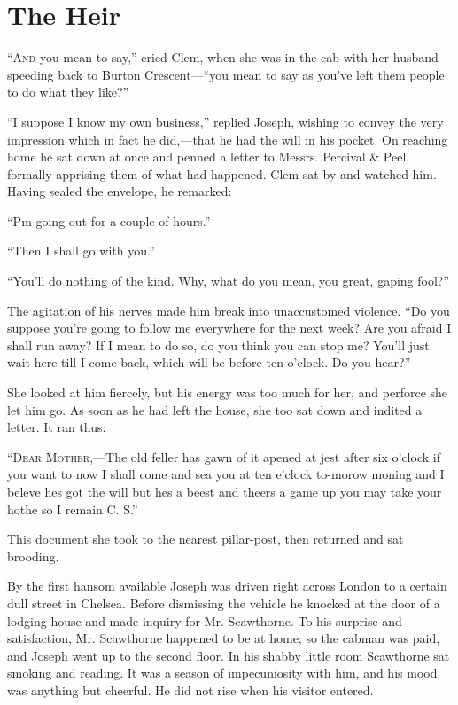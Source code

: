 \chapter{The Heir}

\textsc{``And} you mean to say,'' cried Clem, when she was in the cab
with her husband speeding back to Burton Crescent---``you mean to say as
you've left them people to do what they like?''

``I suppose I know my own business,'' replied Joseph, wishing to convey
the very impression which in fact he did,---that he had the will in his
pocket. On reaching home he sat down at once and penned a letter to
Messrs. Percival \& Peel, formally apprising them of what had happened.
Clem sat by and watched him. Having sealed the envelope, he remarked:

``Pm going out for a couple of hours.''

``Then I shall go with you.''

``You'll do nothing of the kind. Why, what do you mean, you great,
gaping fool?''

The agitation of his nerves made him break {}into unaccustomed violence.
``Do you suppose you're going to follow me everywhere for the next week?
Are you afraid I shall run away? If I mean to do so, do you think you
can stop me? You'll just wait here till I come back, which will be
before ten o'clock. Do you hear?''

She looked at him fiercely, but his energy was too much for her, and
perforce she let him go. As soon as he had left the house, she too sat
down and indited a letter. It ran thus:

``\textsc{Dear Mother},---The old feller has gawn of it apened at jest
after six o'clock if you want to now I shall come and sea you at ten
e'clock to-morow moning and I beleve hes got the will but hes a beest
and theers a game up you may take your hothe so I remain C. S.''

This document she took to the nearest pillar-post, then returned and sat
brooding.

By the first hansom available Joseph was driven right across London to a
certain dull street in Chelsea. Before dismissing the vehicle he knocked
at the door of a lodging-house and made inquiry for Mr. Scawthorne. To
his surprise and satisfaction, Mr. {}Scawthorne happened to be at home;
so the cabman was paid, and Joseph went up to the second floor. In his
shabby little room Scawthorne sat smoking and reading. It was a season
of impecuniosity with him, and his mood was anything but cheerful. He
did not rise when his visitor entered.

